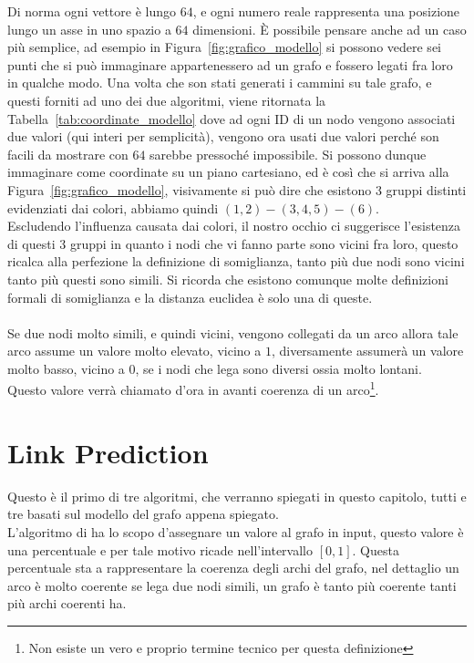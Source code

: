 Di norma ogni vettore è lungo $64$, e ogni numero reale rappresenta una posizione lungo un asse in uno spazio a $64$ dimensioni. È possibile pensare anche ad un caso più semplice, ad esempio in Figura~\ref{fig:grafico_modello} si possono vedere sei punti che si può immaginare appartenessero ad un grafo e fossero legati fra loro in qualche modo. Una volta che son stati generati i cammini su tale grafo, e questi forniti ad uno dei due algoritmi, viene ritornata la Tabella~\ref{tab:coordinate_modello} dove ad ogni ID di un nodo vengono associati due valori (qui interi per semplicità), vengono ora usati due valori perché son facili da mostrare con $64$ sarebbe pressoché impossibile. Si possono dunque immaginare come coordinate su un piano cartesiano, ed è così che si arriva alla Figura~\ref{fig:grafico_modello}, visivamente si può dire che esistono 3 gruppi distinti evidenziati dai colori, abbiamo quindi $(1, 2) - (3, 4, 5) - (6)$.\\
Escludendo l'influenza causata dai colori, il nostro occhio ci suggerisce l'esistenza di questi 3 gruppi in quanto i nodi che vi fanno parte sono vicini fra loro, questo ricalca alla perfezione la definizione di somiglianza, tanto più due nodi sono vicini tanto più questi sono simili. Si ricorda che esistono comunque molte definizioni formali di somiglianza e la distanza euclidea è solo una di queste.\\
\\
Se due nodi molto simili, e quindi vicini, vengono collegati da un arco allora tale arco assume un valore molto elevato, vicino a $1$, diversamente assumerà un valore molto basso, vicino a $0$, se i nodi che lega sono diversi ossia molto lontani.\\
Questo valore verrà chiamato d'ora in avanti coerenza di un arco\footnote{Non esiste un vero e proprio termine tecnico per questa definizione}.
%
\section{Link Prediction}
Questo è il primo di tre algoritmi, che verranno spiegati in questo capitolo, tutti e tre basati sul modello del grafo appena spiegato.\\
L'algoritmo di \LPred ha lo scopo d'assegnare un valore al grafo in input, questo valore è una percentuale e per tale motivo ricade nell'intervallo $[0, 1]$. Questa percentuale sta a rappresentare la coerenza degli archi del grafo, nel dettaglio un arco è molto coerente se lega due nodi simili, un grafo è tanto più coerente tanti più archi coerenti ha.
%

